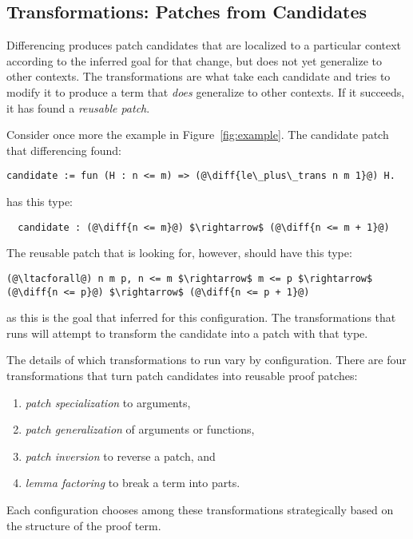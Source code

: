 \subsection{Transformations: Patches from Candidates}
\label{sec:pumpkin-spec-trans}

Differencing produces patch candidates that are localized to a particular context according to the inferred goal for that change,
but does not yet generalize to other contexts.
The transformations are what take each candidate and tries to modify it to produce a term that \textit{does} generalize to other contexts.
If it succeeds, it has found a \textit{reusable patch}.

Consider once more the example in Figure~\ref{fig:example}.
The candidate patch that differencing found:

\begin{lstlisting}[language=coq]
  candidate := fun (H : n <= m) => (@\diff{le\_plus\_trans n m 1}@) H.
\end{lstlisting}
has this type:

\begin{lstlisting}
  candidate : (@\diff{n <= m}@) $\rightarrow$ (@\diff{n <= m + 1}@)
\end{lstlisting}
The reusable patch that \sysname is looking for, however, should have this type:

\begin{lstlisting}[language=coq]
  (@\ltacforall@) n m p, n <= m $\rightarrow$ m <= p $\rightarrow$ (@\diff{n <= p}@) $\rightarrow$ (@\diff{n <= p + 1}@)
\end{lstlisting}
as this is the goal that \sysname inferred for this configuration.
The transformations that \sysname runs will attempt to transform the candidate
into a patch with that type.

The details of which transformations to run vary by configuration.
There are four transformations that turn patch candidates into reusable proof patches:

\begin{enumerate}
\item \textit{patch specialization} to arguments,
\item \textit{patch generalization} of arguments or functions,
\item \textit{patch inversion} to reverse a patch, and
\item \textit{lemma factoring} to break a term into parts.
\end{enumerate}
Each configuration chooses among these transformations strategically based on the structure of the proof term.

